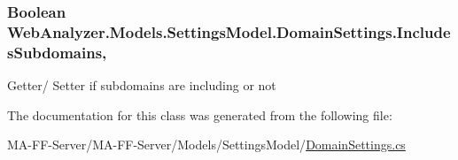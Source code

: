 \subsubsection[{Includes\+Subdomains}]{\setlength{\rightskip}{0pt plus 5cm}Boolean Web\+Analyzer.\+Models.\+Settings\+Model.\+Domain\+Settings.\+Includes\+Subdomains\hspace{0.3cm}{\ttfamily [get]}, {\ttfamily [set]}}\label{class_web_analyzer_1_1_models_1_1_settings_model_1_1_domain_settings_a55ea049e39a701dd4664daa1a53b1a92}


Getter/ Setter if subdomains are including or not 



The documentation for this class was generated from the following file\+:\begin{DoxyCompactItemize}
\item 
M\+A-\/\+F\+F-\/\+Server/\+M\+A-\/\+F\+F-\/\+Server/\+Models/\+Settings\+Model/\hyperlink{_domain_settings_8cs}{Domain\+Settings.\+cs}\end{DoxyCompactItemize}
